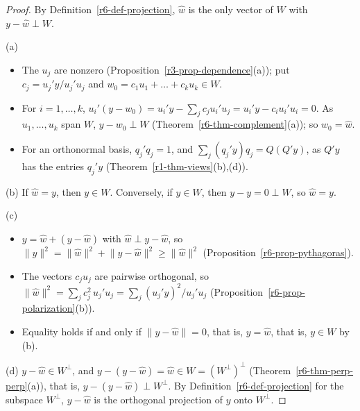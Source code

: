 \documentclass[12pt]{article}
\theoremstyle{definition}
\begin{document}
\begin{proof}
By Definition~\ref{r6-def-projection}, \(\hat w\) is the only vector of \(W\) with \(y-\hat w\perp W\).

(a)
\begin{itemize}
\item The \(u_j\) are nonzero (Proposition~\ref{r3-prop-dependence}(a)); put \(c_j=u_j'y/u_j'u_j\) and
\(w_0=c_1u_1+\dots+c_ku_k\in W\).
\item For \(i=1,\dots,k\), \(u_i'(y-w_0)=u_i'y-\sum_jc_ju_i'u_j=u_i'y-c_iu_i'u_i=0\). As \(u_1,\dots,u_k\) span \(W\),
\(y-w_0\perp W\) (Theorem~\ref{r6-thm-complement}(a)); so \(w_0=\hat w\).
\item For an orthonormal basis, \(q_j'q_j=1\), and \(\sum_j(q_j'y)q_j=Q(Q'y)\), as \(Q'y\) has the entries
\(q_j'y\) (Theorem~\ref{r1-thm-views}(b),(d)).
\end{itemize}
(b) If \(\hat w=y\), then \(y\in W\). Conversely, if \(y\in W\), then \(y-y=0\perp W\), so \(\hat w=y\).

(c)
\begin{itemize}
\item \(y=\hat w+(y-\hat w)\) with \(\hat w\perp y-\hat w\), so
\(\lVert y\rVert^2=\lVert\hat w\rVert^2+\lVert y-\hat w\rVert^2\geqslant\lVert\hat w\rVert^2\)
(Proposition~\ref{r6-prop-pythagoras}).
\item The vectors \(c_ju_j\) are pairwise orthogonal, so
\(\lVert\hat w\rVert^2=\sum_jc_j^2\,u_j'u_j=\sum_j(u_j'y)^2/u_j'u_j\) (Proposition~\ref{r6-prop-polarization}(b)).
\item Equality holds if and only if \(\lVert y-\hat w\rVert=0\), that is, \(y=\hat w\), that is, \(y\in W\) by (b).
\end{itemize}
(d) \(y-\hat w\in W^\perp\), and \(y-(y-\hat w)=\hat w\in W=(W^\perp)^\perp\) (Theorem~\ref{r6-thm-perp-perp}(a)),
that is, \(y-(y-\hat w)\perp W^\perp\). By Definition~\ref{r6-def-projection} for the subspace \(W^\perp\),
\(y-\hat w\) is the orthogonal projection of \(y\) onto \(W^\perp\).
\end{proof}
\end{document}
